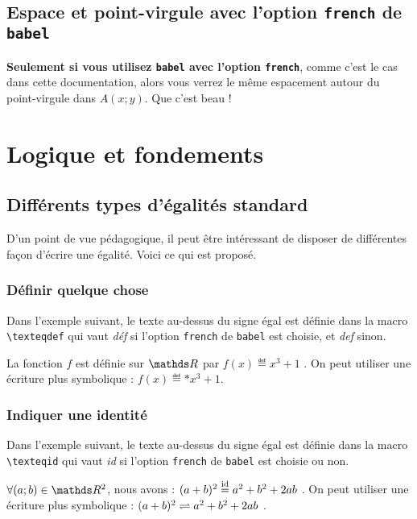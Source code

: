 \documentclass[12pt,a4paper]{article}
\theoremstyle{definition}
\begin{document}
	\subsection{Espace et point-virgule avec l'option \texttt{french} de \texttt{babel}}

\textbf{Seulement si vous utilisez \texttt{babel} avec l'option \texttt{french}}, comme c'est le cas dans cette documentation, alors vous verrez le même espacement autour du point-virgule dans $A(x;y)$. Que c'est beau !




\section{Logique et fondements}

    \subsection{Différents types d'égalités \og standard \fg}
    
D'un point de vue pédagogique, il peut être intéressant de disposer de différentes façon d'écrire une égalité. Voici ce qui est proposé.

        \subsubsection{Définir quelque chose}

Dans l'exemple suivant, le texte au-dessus du signe égal est définie dans la macro \verb+\texteqdef+ qui vaut \emph{\og déf \fg} si l'option \verb+french+ de \verb+babel+ est choisie, et \emph{\og def \fg} sinon.

\begin{tcblisting}{}
La fonction $f$ est définie sur $\RR$ par $f(x) \eqdef x^3 + 1$ .
On peut utiliser une écriture plus symbolique : $f(x) \eqdef* x^3 + 1$.
\end{tcblisting}


        \subsubsection{Indiquer une identité}

Dans l'exemple suivant, le texte au-dessus du signe égal est définie dans la macro \verb+\texteqid+ qui vaut \emph{\og id \fg} si l'option \verb+french+ de \verb+babel+ est choisie ou non.

\begin{tcblisting}{}
$\forall (a ; b) \in \RR^2$, nous avons : $(a + b)^2 \eqid a^2 + b^2 + 2 a b$ .
On peut utiliser une écriture plus symbolique : $(a + b)^2 \eqid* a^2 + b^2 + 2 a b$ .
\end{tcblisting}
\end{document}
